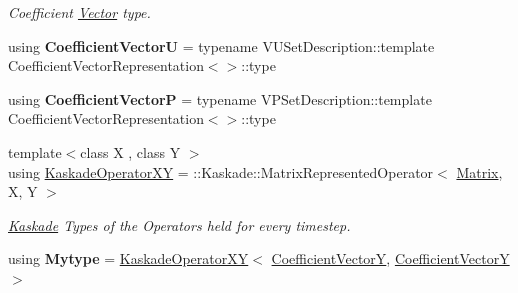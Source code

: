 \begin{DoxyCompactItemize}
\begin{DoxyCompactList}\small\item\em Coefficient \hyperlink{classSpacy_1_1KaskadeParabolic_1_1Vector}{Vector} type. \end{DoxyCompactList}\item 
\hypertarget{classSpacy_1_1KaskadeParabolic_1_1OCP_1_1DirectBlockPreconditioner_a8ebd03f0a1b92dabdd5c3088a3cec23a}{using {\bfseries Coefficient\-Vector\-U} = typename V\-U\-Set\-Description\-::template Coefficient\-Vector\-Representation$<$$>$\-::type}\label{classSpacy_1_1KaskadeParabolic_1_1OCP_1_1DirectBlockPreconditioner_a8ebd03f0a1b92dabdd5c3088a3cec23a}

\item 
\hypertarget{classSpacy_1_1KaskadeParabolic_1_1OCP_1_1DirectBlockPreconditioner_a56f012444321bb8226718c0703d75a9b}{using {\bfseries Coefficient\-Vector\-P} = typename V\-P\-Set\-Description\-::template Coefficient\-Vector\-Representation$<$$>$\-::type}\label{classSpacy_1_1KaskadeParabolic_1_1OCP_1_1DirectBlockPreconditioner_a56f012444321bb8226718c0703d75a9b}

\item 
\hypertarget{classSpacy_1_1KaskadeParabolic_1_1OCP_1_1DirectBlockPreconditioner_ac4bc446b30094d154f3288f8551c995b}{{\footnotesize template$<$class X , class Y $>$ }\\using \hyperlink{classSpacy_1_1KaskadeParabolic_1_1OCP_1_1DirectBlockPreconditioner_ac4bc446b30094d154f3288f8551c995b}{Kaskade\-Operator\-X\-Y} = \-::Kaskade\-::\-Matrix\-Represented\-Operator$<$ \hyperlink{classSpacy_1_1KaskadeParabolic_1_1OCP_1_1DirectBlockPreconditioner_a73578f2e6a968974f7188d15b66aefcf}{Matrix}, X, Y $>$}\label{classSpacy_1_1KaskadeParabolic_1_1OCP_1_1DirectBlockPreconditioner_ac4bc446b30094d154f3288f8551c995b}

\begin{DoxyCompactList}\small\item\em \hyperlink{namespaceSpacy_1_1Kaskade}{Kaskade} Types of the Operators held for every timestep. \end{DoxyCompactList}\item 
\hypertarget{classSpacy_1_1KaskadeParabolic_1_1OCP_1_1DirectBlockPreconditioner_a9e0dd273826ef30a439ae7869ec65f33}{using {\bfseries Mytype} = \hyperlink{classSpacy_1_1KaskadeParabolic_1_1OCP_1_1DirectBlockPreconditioner_ac4bc446b30094d154f3288f8551c995b}{Kaskade\-Operator\-X\-Y}$<$ \hyperlink{classSpacy_1_1KaskadeParabolic_1_1OCP_1_1DirectBlockPreconditioner_ac848a8d3baacc98f9bdbf951cdb9b64d}{Coefficient\-Vector\-Y}, \hyperlink{classSpacy_1_1KaskadeParabolic_1_1OCP_1_1DirectBlockPreconditioner_ac848a8d3baacc98f9bdbf951cdb9b64d}{Coefficient\-Vector\-Y} $>$}\label{classSpacy_1_1KaskadeParabolic_1_1OCP_1_1DirectBlockPreconditioner_a9e0dd273826ef30a439ae7869ec65f33}


\end{DoxyCompactItemize}
